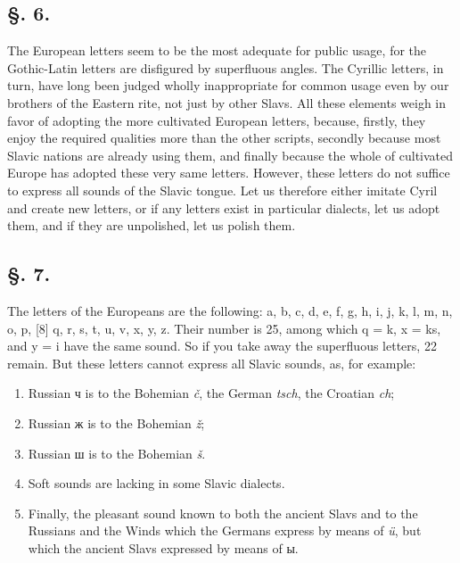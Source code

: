 \subsection*{\hspace*{\fill}§. 6.\hspace*{\fill}}

The European letters seem to be the most adequate for public usage, for the Gothic-Latin letters are disfigured by superfluous angles. The Cyrillic letters, in turn, have long been judged wholly inappropriate for common usage even by our brothers of the Eastern rite, not just by other Slavs. All these elements weigh in favor of adopting the more cultivated European letters, because, firstly, they enjoy the required qualities more than the other scripts, secondly because most Slavic nations are already using them, and finally because the whole of cultivated Europe has adopted these very same letters. However, these letters do not suffice to express all sounds of the Slavic tongue. Let us therefore either imitate Cyril and create new letters, or if any letters exist in particular dialects, let us adopt them, and if they are unpolished, let us polish them.

\subsection*{\hspace*{\fill}§. 7.\hspace*{\fill}}

The letters of the Europeans are the following: a, b, c, d, e, f, g, h, i, j, k, l, m, n, o, p, [8] q, r, s, t, u, v, x, y, z. Their number is 25, among which q = k, x = ks, and y = i have the same sound. So if you take away the superfluous letters, 22 remain. But these letters cannot express all Slavic sounds, as, for example:
\begin{enumerate}
    \item {Russian ч is to the Bohemian \textit{č}, the German \textit{tsch}, the Croatian \textit{ch};}
    \item {Russian ж is to the Bohemian \textit{ž};}
    \item {Russian ш is to the Bohemian \textit{š}.}
    \item {Soft sounds are lacking in some Slavic dialects.}
    \item {Finally, the pleasant sound known to both the ancient Slavs and to the Russians and the Winds which the Germans express by means of \textit{ü}, but which the ancient Slavs expressed by means of ы.}
\end{enumerate}

